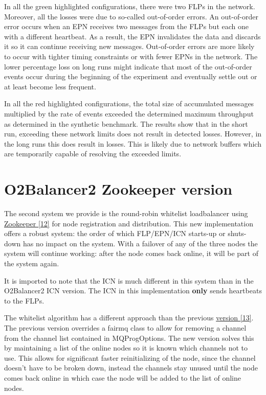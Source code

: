 \documentclass[]{article}
\begin{document}
In all the green highlighted configurations, there were two FLPs in the network. Moreover, all the losses were due to so-called out-of-order errors. An out-of-order error occurs when an EPN receives two messages from the FLPs but each one with a different heartbeat. As a result, the EPN invalidates the data and discards it so it can continue receiving new messages. Out-of-order errors are more likely to occur with tighter timing constraints or with fewer EPNs in the network. The lower percentage loss on long runs might indicate that most of the out-of-order events occur during the beginning of the experiment and eventually settle out or at least become less frequent.

In all the red highlighted configurations, the total size of accumulated messages multiplied by the rate of events exceeded the determined maximum throughput as determined in the synthetic benchmark. The results show that in the short run, exceeding these network limits does not result in detected losses. However, in the long runs this does result in losses. This is likely due to network buffers which are temporarily capable of resolving the exceeded limits.


\section{O2Balancer2 Zookeeper version}
The second system we provide is the round-robin whitelist loadbalancer using \hyperref[sec:ref12]{Zookeeper [12]} for node registration and distribution. This new implementation offers a robust system: the order of which FLP/EPN/ICN starts-up or shuts-down has no impact on the system. With a failover of any of the three nodes the system will continue working: after the node comes back online, it will be part of the system again. 

It is imported to note that the ICN is much different in this system than in the O2Balancer2 ICN version. The ICN in this implementation \textbf{only} sends heartbeats to the FLPs.

The whitelist algorithm has a different approach than the previous \hyperref[sec:ref13]{version [13]}. The previous version overrides a fairmq class to allow for removing a channel from the channel list contained in MQProgOptions.  The new version solves this by maintaining a list of the online nodes so it is known which channels not to use. This allows for significant faster reinitializing of the node, since the channel doesn’t have to be broken down, instead the channels stay unused until the node comes back online in which case the node will be added to the list of online nodes. 
\end{document}
